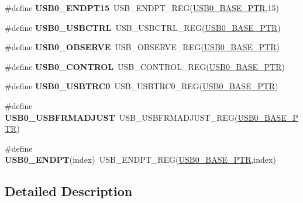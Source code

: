 \begin{DoxyCompactItemize}
\item 
\mbox{\label{group___u_s_b___register___accessor___macros_ga1441b218ac6dadd6484db29426f85f97}} 
\#define {\bfseries U\+S\+B0\+\_\+\+E\+N\+D\+P\+T15}~U\+S\+B\+\_\+\+E\+N\+D\+P\+T\+\_\+\+R\+EG(\hyperlink{group___u_s_b___peripheral_ga598ff5eb20a0551af232710b3f27640a}{U\+S\+B0\+\_\+\+B\+A\+S\+E\+\_\+\+P\+TR},15)
\item 
\mbox{\label{group___u_s_b___register___accessor___macros_gacfea8f658537d98fc0bdd1814e957090}} 
\#define {\bfseries U\+S\+B0\+\_\+\+U\+S\+B\+C\+T\+RL}~U\+S\+B\+\_\+\+U\+S\+B\+C\+T\+R\+L\+\_\+\+R\+EG(\hyperlink{group___u_s_b___peripheral_ga598ff5eb20a0551af232710b3f27640a}{U\+S\+B0\+\_\+\+B\+A\+S\+E\+\_\+\+P\+TR})
\item 
\mbox{\label{group___u_s_b___register___accessor___macros_gae7fc760132c134248d833d94ec89635e}} 
\#define {\bfseries U\+S\+B0\+\_\+\+O\+B\+S\+E\+R\+VE}~U\+S\+B\+\_\+\+O\+B\+S\+E\+R\+V\+E\+\_\+\+R\+EG(\hyperlink{group___u_s_b___peripheral_ga598ff5eb20a0551af232710b3f27640a}{U\+S\+B0\+\_\+\+B\+A\+S\+E\+\_\+\+P\+TR})
\item 
\mbox{\label{group___u_s_b___register___accessor___macros_gaf00c1bd9c15954db30472d3273cf7ec2}} 
\#define {\bfseries U\+S\+B0\+\_\+\+C\+O\+N\+T\+R\+OL}~U\+S\+B\+\_\+\+C\+O\+N\+T\+R\+O\+L\+\_\+\+R\+EG(\hyperlink{group___u_s_b___peripheral_ga598ff5eb20a0551af232710b3f27640a}{U\+S\+B0\+\_\+\+B\+A\+S\+E\+\_\+\+P\+TR})
\item 
\mbox{\label{group___u_s_b___register___accessor___macros_ga05ec0dc133dcc7675dda9e96c6ed222b}} 
\#define {\bfseries U\+S\+B0\+\_\+\+U\+S\+B\+T\+R\+C0}~U\+S\+B\+\_\+\+U\+S\+B\+T\+R\+C0\+\_\+\+R\+EG(\hyperlink{group___u_s_b___peripheral_ga598ff5eb20a0551af232710b3f27640a}{U\+S\+B0\+\_\+\+B\+A\+S\+E\+\_\+\+P\+TR})
\item 
\mbox{\label{group___u_s_b___register___accessor___macros_ga7b5628cccd04a47b3f3bc51d01b7fc2d}} 
\#define {\bfseries U\+S\+B0\+\_\+\+U\+S\+B\+F\+R\+M\+A\+D\+J\+U\+ST}~U\+S\+B\+\_\+\+U\+S\+B\+F\+R\+M\+A\+D\+J\+U\+S\+T\+\_\+\+R\+EG(\hyperlink{group___u_s_b___peripheral_ga598ff5eb20a0551af232710b3f27640a}{U\+S\+B0\+\_\+\+B\+A\+S\+E\+\_\+\+P\+TR})
\item 
\mbox{\label{group___u_s_b___register___accessor___macros_gab12df1a4de08fae1e4662a2cb4060b5e}} 
\#define {\bfseries U\+S\+B0\+\_\+\+E\+N\+D\+PT}(index)~U\+S\+B\+\_\+\+E\+N\+D\+P\+T\+\_\+\+R\+EG(\hyperlink{group___u_s_b___peripheral_ga598ff5eb20a0551af232710b3f27640a}{U\+S\+B0\+\_\+\+B\+A\+S\+E\+\_\+\+P\+TR},index)
\end{DoxyCompactItemize}


\subsection{Detailed Description}
